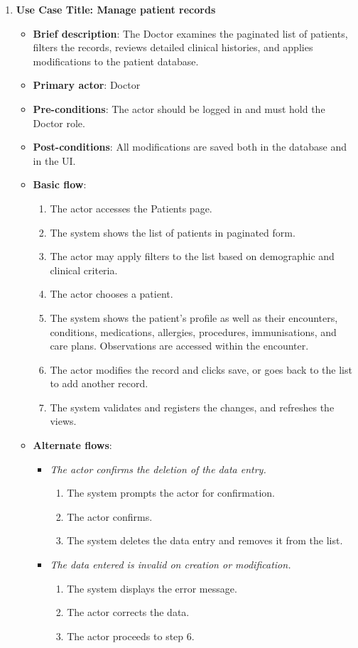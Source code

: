 \begin{enumerate}
\vspace{0.5em}

\item \textbf{Use Case Title: Manage patient records}
\begin{itemize}
    \item \textbf{Brief description}: The Doctor examines the paginated list of patients, filters the records, reviews detailed clinical histories, and applies modifications to the patient database.
    \item \textbf{Primary actor}: Doctor
    \item \textbf{Pre-conditions}: The actor should be logged in and must hold the Doctor role.
    \item \textbf{Post-conditions}: All modifications are saved both in the database and in the UI.
    \item \textbf{Basic flow}:
    \begin{enumerate}
        \item The actor accesses the Patients page.
        \item The system shows the list of patients in paginated form.
        \item The actor may apply filters to the list based on demographic and clinical criteria.
        \item The actor chooses a patient.
        \item The system shows the patient's profile as well as their encounters, conditions, medications, allergies, procedures, immunisations, and care plans. Observations are accessed within the encounter.
        \item The actor modifies the record and clicks save, or goes back to the list to add another record.
        \item The system validates and registers the changes, and refreshes the views.
    \end{enumerate}
    \item \textbf{Alternate flows}:
    \begin{itemize}
        \item[6a.] \textit{The actor confirms the deletion of the data entry.}
        \begin{enumerate}
            \item The system prompts the actor for confirmation.
            \item The actor confirms.
            \item The system deletes the data entry and removes it from the list.
        \end{enumerate}
        \item[7a.] \textit{The data entered is invalid on creation or modification.}
        \begin{enumerate}
            \item The system displays the error message.
            \item The actor corrects the data.
            \item The actor proceeds to step 6.
        \end{enumerate}
    \end{itemize}
\end{itemize}


\end{enumerate}
